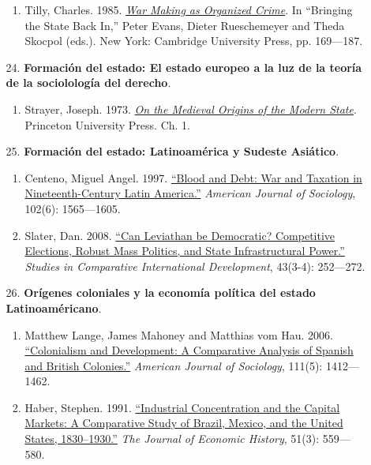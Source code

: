 \documentclass[letterpaper]{article}
\begin{document}
\begin{enumerate}
\begin{enumerate}
\begin{enumerate}
					\item Tilly, Charles. 1985. \href{https://github.com/hbahamonde/Ciencia_Politica_I/raw/master/Readings/Tilly.pdf}{\emph{War Making as Organized Crime}}. In ``Bringing the State Back In,'' Peter Evans, Dieter Rueschemeyer and Theda Skocpol (eds.). New York: Cambridge University Press, pp. 169---187.
				\end{enumerate}
			
			\item[24.] {\bf Formaci\'on del estado: El estado europeo a la luz de la teor\'ia de la sociololog\'ia del derecho}.
				\begin{enumerate} 
					\item Strayer, Joseph. 1973. \href{https://github.com/hbahamonde/Ciencia_Politica_I/raw/master/Readings/Strayer.pdf}{\emph{On the Medieval Origins of the Modern State}}. Princeton University Press. Ch. 1.
				\end{enumerate}

			\item[25.] {\bf Formaci\'on del estado: Latinoam\'erica y Sudeste Asi\'atico}.
				\begin{enumerate}
					\item Centeno, Miguel Angel. 1997. \href{https://github.com/hbahamonde/Ciencia_Politica_I/raw/master/Readings/Centeno.pdf}{``Blood and Debt: War and Taxation in Nineteenth-Century Latin America.''} \emph{American Journal of Sociology}, 102(6): 1565---1605. 
					
					\item Slater, Dan. 2008. \href{https://github.com/hbahamonde/Ciencia_Politica_I/raw/master/Readings/Slater.pdf}{``Can Leviathan be Democratic? Competitive Elections, Robust Mass Politics, and State Infrastructural Power.''} \emph{Studies in Comparative International Development}, 43(3-4): 252---272.
				\end{enumerate}


      \item[26.] {\bf Or\'igenes coloniales y la econom\'ia pol\'itica del estado Latinoam\'ericano}.
        \begin{enumerate}
          \item Matthew Lange, James Mahoney and Matthias vom Hau. 2006. \href{https://github.com/hbahamonde/Ciencia_Politica_I/raw/master/Readings/Mahoney_et_al_2006.pdf}{``Colonialism and Development: A Comparative Analysis of Spanish and British Colonies.''} \emph{American Journal of Sociology}, 111(5): 1412---1462.
          \item Haber, Stephen. 1991. \href{https://github.com/hbahamonde/Ciencia_Politica_I/raw/master/Readings/Haber_1991.pdf}{``Industrial Concentration and the Capital Markets: A Comparative Study of Brazil, Mexico, and the United States, 1830–1930.''} \emph{The Journal of Economic History}, 51(3): 559---580.
        \end{enumerate}


\end{enumerate}
\end{enumerate}
\end{document}
